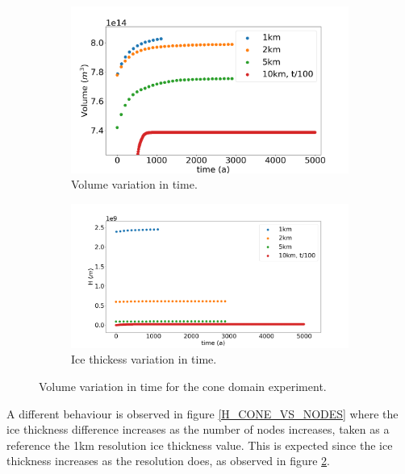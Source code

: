\documentclass{article}
\begin{document}
\begin{figure}[!h]
	\centering
	\begin{subfigure}{.5\textwidth}
		\centering
		\includegraphics[width=1.1\linewidth]{../fig/Volume_CONE_full_all_res_vs_time.png}
		\caption{Volume variation in time.}
		\label{VOLUME_CONE_VS_TIME}
	\end{subfigure}%
	\begin{subfigure}{.5\textwidth}
	\centering
	\includegraphics[width=1.1\linewidth]{../fig/H_CONE_full_all_res_vs_time.png}
	\caption{Ice thickess variation in time.}
	\label{H_CONE_VS_TIME}
	\end{subfigure}%
	\caption{Volume variation in time for the cone domain experiment.}
	\label{Volume_CONE_VS_TIME_VS_NODES}
\end{figure}

A different behaviour is observed in figure \ref{H_CONE_VS_NODES} where the ice thickness difference increases as the number of nodes increases, taken as a reference the 1km resolution ice thickness value. This is expected since the ice thickness increases as the resolution does, as observed in figure \ref{H_CONE_VS_TIME}. 
\end{document}
